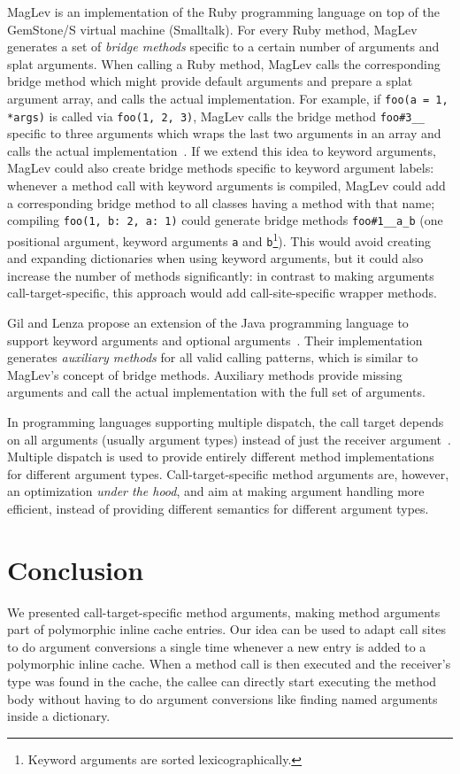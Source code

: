 \documentclass{sigplanconf} %
\begin{document}
MagLev is an implementation of the Ruby programming language on top of the GemStone/S virtual machine (Smalltalk). For every Ruby method, MagLev generates a set of \emph{bridge methods} specific to a certain number of arguments and splat arguments. When calling a Ruby method, MagLev calls the corresponding bridge method which might provide default arguments and prepare a splat argument array, and calls the actual implementation. For example, if \lstinline{foo(a = 1, *args)} is called via \lstinline{foo(1, 2, 3)}, MagLev calls the bridge method \lstinline{foo#3__} specific to three arguments which wraps the last two arguments in an array and calls the actual implementation~\cite{SprBachelor}. If we extend this idea to keyword arguments, MagLev could also create bridge methods specific to keyword argument labels: whenever a method call with keyword arguments is compiled, MagLev could add a corresponding bridge method to all classes having a method with that name; \eg compiling \lstinline{foo(1, b: 2, a: 1)} could generate bridge methods \lstinline{foo#1__a_b} (one positional argument, keyword arguments \lstinline{a} and \lstinline{b}\footnote{Keyword arguments are sorted lexicographically.}). This would avoid creating and expanding dictionaries when using keyword arguments, but it could also increase the number of methods significantly: in contrast to making arguments call-target-specific, this approach would add call-site-specific wrapper methods.

Gil and Lenza propose an extension of the Java programming language to support keyword arguments and optional arguments~\cite{JOT:issue_2012_04/article1}. Their implementation generates \emph{auxiliary methods} for all valid calling patterns, which is similar to MagLev's concept of bridge methods. Auxiliary methods provide missing arguments and call the actual implementation with the full set of arguments.

In programming languages supporting multiple dispatch, the call target depends on all arguments (usually argument types) instead of just the receiver argument~\cite{multimethods}. Multiple dispatch is used to provide entirely different method implementations for different argument types. Call-target-specific method arguments are, however, an optimization \emph{under the hood}, and aim at making argument handling more efficient, instead of providing different semantics for different argument types.

\section{Conclusion}
We presented call-target-specific method arguments, making method arguments part of polymorphic inline cache entries. Our idea can be used to adapt call sites to do argument conversions a single time whenever a new entry is added to a polymorphic inline cache. When a method call is then executed and the receiver's type was found in the cache, the callee can directly start executing the method body without having to do argument conversions like finding named arguments inside a dictionary.
\end{document}
